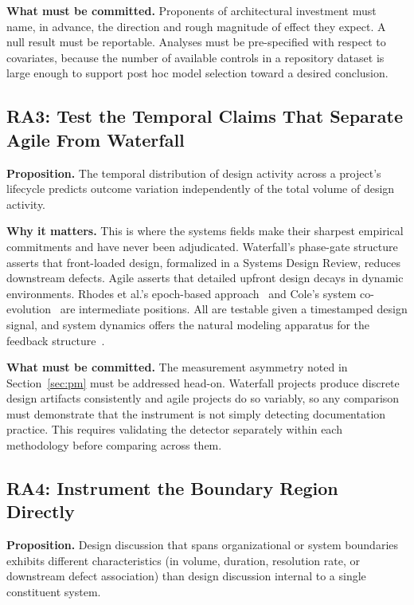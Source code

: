 \documentclass{csimq}
\begin{document}
\textbf{What must be committed.} Proponents of architectural investment must
name, in advance, the direction and rough magnitude of effect they expect. A
null result must be reportable. Analyses must be pre-specified with respect to
covariates, because the number of available controls in a repository dataset is
large enough to support post hoc model selection toward a desired conclusion.

\subsection{RA3: Test the Temporal Claims That Separate Agile From Waterfall}

\textbf{Proposition.} The temporal distribution of design activity across a
project's lifecycle predicts outcome variation independently of the total volume
of design activity.

\textbf{Why it matters.} This is where the systems fields make their
sharpest empirical commitments and have never been adjudicated. Waterfall's
phase-gate structure asserts that front-loaded design, formalized in a Systems
Design Review, reduces downstream defects. Agile asserts that detailed upfront
design decays in dynamic environments. Rhodes et al.'s epoch-based
approach~\cite{rhodes2009} and Cole's system co-evolution~\cite{cole2006} are
intermediate positions. All are testable given a timestamped design signal, and
system dynamics offers the natural modeling apparatus for the feedback
structure~\cite{forrester2009,khatun2023}.

\textbf{What must be committed.} The measurement asymmetry noted in
Section~\ref{sec:pm} must be addressed head-on. Waterfall projects produce
discrete design artifacts consistently and agile projects do so variably, so any comparison must
demonstrate that the instrument is not simply detecting documentation practice.
This requires validating the detector separately within each methodology before
comparing across them.

\subsection{RA4: Instrument the Boundary Region Directly}

\textbf{Proposition.} Design discussion that spans organizational or system
boundaries exhibits different characteristics (in volume, duration, resolution
rate, or downstream defect association) than design discussion internal to a
single constituent system.
\end{document}
